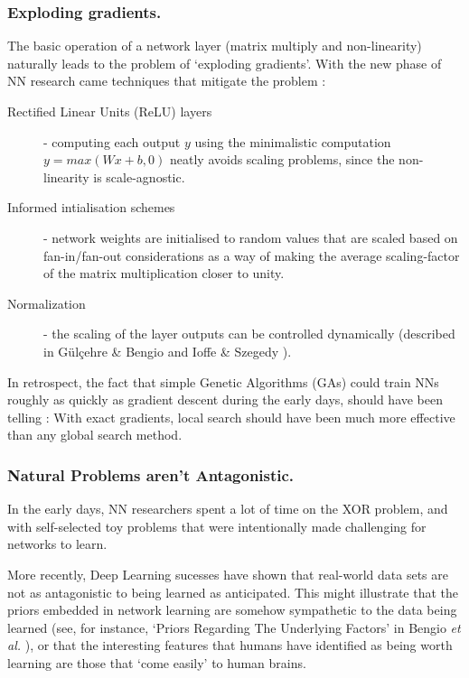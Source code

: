 \documentclass[citeauthoryear]{llncs}
\begin{document}
\subsubsection*{Exploding gradients.}

The basic operation of a network layer (matrix multiply and non-linearity) 
naturally leads to the problem of `exploding gradients'.
With the new phase of NN research came techniques that mitigate the problem : 

\begin{description}

\item[Rectified Linear Units (ReLU) layers] - computing each output $y$ 
using the minimalistic computation $y=max(Wx+b, 0)$ neatly avoids 
scaling problems, since the non-linearity is scale-agnostic.

\item[Informed intialisation schemes] - network weights are initialised 
to random values that are scaled based on fan-in/fan-out considerations as a way of making the 
average scaling-factor of the matrix multiplication closer to unity.

\item[Normalization] - the scaling of the layer outputs can be controlled
dynamically (described in G{\"u}l{\c{c}}ehre \& Bengio \cite{bengio-whitening} and 
Ioffe \& Szegedy \cite{WhiteningOfData}).

\end{description}

In retrospect, the fact that simple Genetic Algorithms (GAs) could train 
NNs roughly as quickly as gradient descent during the early days, 
should have been telling : With exact gradients, local search should have 
been much more effective than any global search method.


\subsubsection*{Natural Problems aren't Antagonistic.}

In the early days, NN researchers spent a lot of time on the 
XOR problem, and with self-selected toy problems that were 
intentionally made challenging for networks to learn.

More recently, Deep Learning sucesses have shown that real-world data sets 
are not as antagonistic to being learned as anticipated.  
This might illustrate that the priors embedded in network learning are 
somehow sympathetic to the data being learned 
(see, for instance, `Priors Regarding The Underlying Factors' in Bengio \emph{et al.} \cite{Bengio-et-al-2014-Book}),
or that the interesting features that humans have identified as being 
worth learning are those that `come easily' to human brains.
\end{document}
